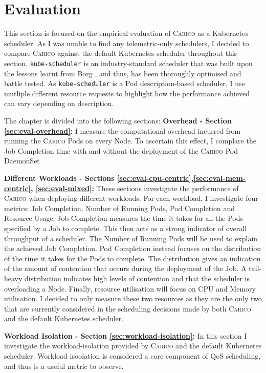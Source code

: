 \chapter{Evaluation}

This section is focused on the empirical evaluation of \textsc{Carico} as a Kubernetes
scheduler. As I was unable to find any telemetric-only schedulers, I decided to
compare \textsc{Carico} against the default Kubernetes scheduler throughout this section.
\texttt{kube-scheduler} is an industry-standard scheduler that was built upon
the lessons learnt from Borg \cite{}, and thus, has been thoroughly optimised
and battle tested. As \texttt{kube-scheduler} is a Pod description-based
scheduler, I use mutliple different resource requests to highlight how the
performance achieved can vary depending on description.

The chapter is divided into the following sections:
\textbf{Overhead - Section \ref{sec:eval-overhead}:} I measure the computational overhead
incurred from running the \textsc{Carico} Pods on every Node. To ascertain this effect, I
complare the Job Completion time with and without the deployment of the \textsc{Carico}
Pod DaemonSet

\textbf{Different Workloads - Sections
\ref{sec:eval-cpu-centric},\ref{sec:eval-mem-centric}, \ref{sec:eval-mixed}:}
These sections investigate the performance of \textsc{Carico} when deploying different
workloads. For each workload, I investigate four metrics: Job Completion, Number
of Running Pods, Pod Completion and Resource Usage. Job Completion measures the
time it takes for all the Pods specified by a Job to complete. This then acts as
a strong indicator of overall throughput of a scheduler. The Number of Running
Pods will be used to explain the achieved Job Completion. Pod Completion instead
focuses on the distribution of the time it takes for the Pods to complete. The
distribution gives an indication of the amount of contention that occurs during
the deployment of the Job. A tail-heavy distribution indicates high levels of
contention and that the scheduler is overloading a Node. Finally, resource
utilisation will focus on CPU and Memory utilisation. I decided to only measure
these two resources as they are the only two that are currently considered in
the scheduling decisions made by both \textsc{Carico} and the default Kubernetes
scheduler.

\textbf{Workload Isolation - Section \ref{sec:workload-isolation}:} In this
section I investigate the workload-isolation provided by \textsc{Carico} and the default
Kubernetes scheduler. Workload isoolation is considered a core component of QoS
scheduling, and thus is a useful metric to observe.


